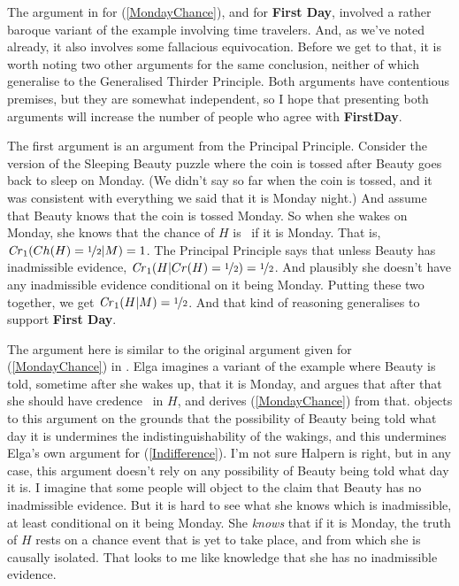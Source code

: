 The argument in \citet{Weatherson-SoSB} for (\ref{MondayChance}), and for \textbf{First Day}, involved a rather baroque variant of the example involving time travelers. And, as we've noted already, it also involves some fallacious equivocation. Before we get to that, it is worth noting two other arguments for the same conclusion, neither of which  generalise to the Generalised Thirder Principle. Both arguments have contentious premises, but they are somewhat independent, so I hope that presenting both arguments will increase the number of people who agree with \textbf{FirstDay}.

The first argument is an argument from the Principal Principle. Consider the version of the Sleeping Beauty puzzle where the coin is tossed after Beauty goes back to sleep on Monday. (We didn't say so far when the coin is tossed, and it was consistent with everything we said that it is Monday night.) And assume that Beauty knows that the coin is tossed Monday. So when she wakes on Monday, she knows that the chance of $H$ is \half\ if it is Monday. That is, $\text{\textit{Cr}}_1(Ch(H) = \nicefrac{1}{2} | M) = 1$. The Principal Principle says that unless Beauty has inadmissible evidence, $\text{\textit{Cr}}_1(H | Cr(H) = \nicefrac{1}{2}) = \nicefrac{1}{2}$. And plausibly she doesn't have any inadmissible evidence conditional on it being Monday. Putting these two together, we get $\text{\textit{Cr}}_1(H | M) = \nicefrac{1}{2}$. And that kind of reasoning generalises to support \textbf{First Day}.

The argument here is similar to the original argument given for (\ref{MondayChance}) in \citet{Elga2000}. Elga imagines a variant of the example where Beauty is told, sometime after she wakes up, that it is Monday, and argues that after that she should have credence \half\ in $H$, and derives (\ref{MondayChance}) from that. \citet{Halpern2004} objects to this argument on the grounds that the possibility of Beauty being told what day it is undermines the indistinguishability of the wakings, and this undermines Elga's own argument for (\ref{Indifference}). I'm not sure Halpern is right, but in any case, this argument doesn't rely on any possibility of Beauty being told what day it is. I imagine that some people will object to the claim that Beauty has no inadmissible evidence. But it is hard to see what she knows which is inadmissible, at least conditional on it being Monday. She \textit{knows} that if it is Monday, the truth of $H$ rests on a chance event that is yet to take place, and from which she is causally isolated. That looks to me like knowledge that she has no inadmissible evidence.

